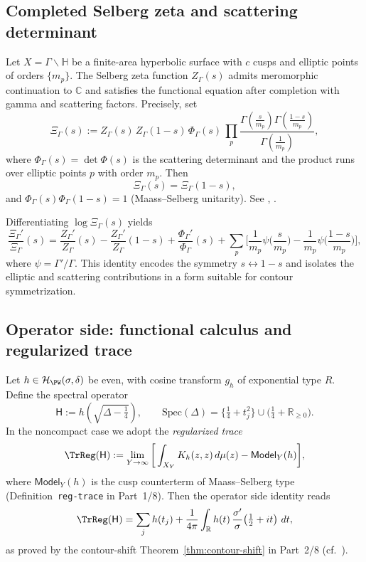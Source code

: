 \subsection{Completed Selberg zeta and scattering determinant}
\label{subsec:completed-zeta}
\relax\hspace{0pt}

Let $X=\Gamma\backslash\mathbb{H}$ be a finite-area hyperbolic surface with
$c$ cusps and elliptic points of orders $\{m_p\}$. The Selberg zeta
function $Z_\Gamma(s)$ admits meromorphic continuation to $\mathbb{C}$
and satisfies the functional equation after completion with gamma and
scattering factors. Precisely, set
\[
\Xi_\Gamma(s)
:= Z_\Gamma(s)\,Z_\Gamma(1-s)\,
\Phi_\Gamma(s)\,
\prod_{p}\frac{\Gamma\!\left(\frac{s}{m_p}\right)\Gamma\!\left(\frac{1-s}{m_p}\right)}
{\Gamma\!\left(\frac{1}{m_p}\right)},
\]
where $\Phi_\Gamma(s)=\det\Phi(s)$ is the scattering determinant and the
product runs over elliptic points $p$ with order $m_p$. Then
\[
\Xi_\Gamma(s)=\Xi_\Gamma(1-s),
\]
and $\Phi_\Gamma(s)\Phi_\Gamma(1-s)=1$ (Maass–Selberg unitarity). See
\cite[Ch.~3–4]{HejhalII}, \cite[Ch.~6]{Borthwick}.                     %

\begin{remark}
\label{rem:log-deriv}
Differentiating $\log\Xi_\Gamma(s)$ yields
\[
\frac{\Xi_\Gamma'}{\Xi_\Gamma}(s)
=\frac{Z_\Gamma'}{Z_\Gamma}(s)-\frac{Z_\Gamma'}{Z_\Gamma}(1-s)
+\frac{\Phi_\Gamma'}{\Phi_\Gamma}(s)
+\sum_{p}\Bigg[\frac{1}{m_p}\psi\!\Big(\frac{s}{m_p}\Big)
-\frac{1}{m_p}\psi\!\Big(\frac{1-s}{m_p}\Big)\Bigg],
\]
where $\psi=\Gamma'/\Gamma$. This identity encodes the symmetry
$s\leftrightarrow 1-s$ and isolates the elliptic and scattering
contributions in a form suitable for contour symmetrization.             %
\end{remark}

\subsection{Operator side: functional calculus and regularized trace}
\label{subsec:operator-side}
\relax\hspace{0pt}

Let $h\in\mathcal{H}_{\PW}(\sigma,\delta)$ be even, with cosine transform
$g_h$ of exponential type $R$. Define the spectral operator
\[
\mathsf{H} := h\!\left(\sqrt{\Delta-\tfrac14}\right),
\qquad
\mathrm{Spec}(\Delta)=\{\tfrac14+t_j^2\}\cup\big(\tfrac14+\mathbb{R}_{\ge 0}\big).
\]
In the noncompact case we adopt the \emph{regularized trace}
\[
\TrReg(\mathsf{H})
:= \lim_{Y\to\infty}\bigg[
\int_{X_Y}K_h(z,z)\,d\mu(z) - \mathsf{Model}_Y(h)\bigg],
\]
where $\mathsf{Model}_Y(h)$ is the cusp counterterm of Maass–Selberg type
(Definition~\texttt{reg-trace} in Part~1/8). Then the operator side
identity reads
\[
\TrReg(\mathsf{H})
=\sum_j h(t_j)+\frac{1}{4\pi}\int_{\mathbb{R}}
h(t)\,\frac{\sigma'}{\sigma}\!\left(\tfrac12+it\right)\,dt,             %
\]
as proved by the contour-shift Theorem~\ref{thm:contour-shift} in
Part~2/8 (cf.\ \cite[Ch.~2–4]{HejhalII}).                                %

